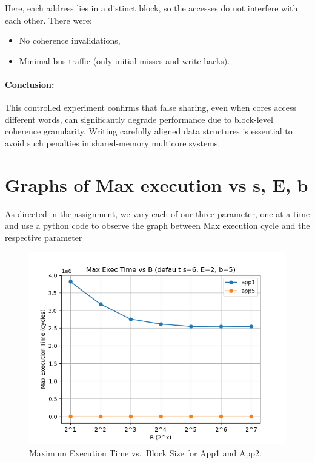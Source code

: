 \documentclass{article}
\begin{document}
Here, each address lies in a distinct block, so the accesses do not interfere with each other. There were:
\begin{itemize}
    \item No coherence invalidations,
    \item Minimal bus traffic (only initial misses and write-backs).
\end{itemize}

\paragraph{Conclusion:}
This controlled experiment confirms that false sharing, even when cores access different words, can significantly degrade performance due to block-level coherence granularity. Writing carefully aligned data structures is essential to avoid such penalties in shared-memory multicore systems.

\section{Graphs of Max execution vs s, E, b}
As directed in the assignment, we vary each of our three parameter, one at a time and use a python code to observe the graph between Max execution cycle and the respective parameter
\begin{figure}[!htbp]
  \centering
  \includegraphics[width=0.8\linewidth]{plot_b.png}
  \caption{Maximum Execution Time vs.\ Block Size for App1 and App2.}
  \label{fig:exec-vs-b}
\end{figure}
\end{document}
